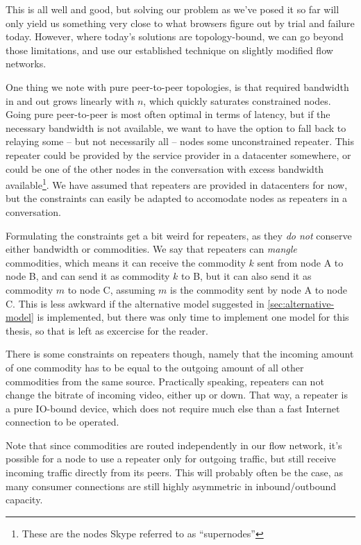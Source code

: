 This is all well and good, but solving our problem as we've posed it so far will only yield us something very close to what browsers figure out by trial and failure today. However, where today's solutions are topology-bound, we can go beyond those limitations, and use our established technique on slightly modified flow networks.

One thing we note with pure peer-to-peer topologies, is that required bandwidth in and out grows linearly with $n$, which quickly saturates constrained nodes. Going pure peer-to-peer is most often optimal in terms of latency, but if the necessary bandwidth is not available, we want to have the option to fall back to relaying some -- but not necessarily all -- nodes some unconstrained repeater. This repeater could be provided by the service provider in a datacenter somewhere, or could be one of the other nodes in the conversation with excess bandwidth available\footnote{These are the nodes Skype referred to as ``supernodes''}. We have assumed that repeaters are provided in datacenters for now, but the constraints can easily be adapted to accomodate nodes as repeaters in a conversation.

Formulating the constraints get a bit weird for repeaters, as they \emph{do not} conserve either bandwidth or commodities. We say that repeaters can \emph{mangle} commodities, which means it can receive the commodity $k$ sent from node A to node B, and can send it as commodity $k$ to B, but it can also send it as commodity $m$ to node C, assuming $m$ is the commodity sent by node A to node C. This is less awkward if the alternative model suggested in \autoref{sec:alternative-model} is implemented, but there was only time to implement one model for this thesis, so that is left as excercise for the reader.

There is some constraints on repeaters though, namely that the incoming amount of one commodity has to be equal to the outgoing amount of all other commodities from the same source. Practically speaking, repeaters can not change the bitrate of incoming video, either up or down. That way, a repeater is a pure IO-bound device, which does not require much else than a fast Internet connection to be operated.

Note that since commodities are routed independently in our flow network, it's possible for a node to use a repeater only for outgoing traffic, but still receive incoming traffic directly from its peers. This will probably often be the case, as many consumer connections are still highly asymmetric in inbound/outbound capacity.

